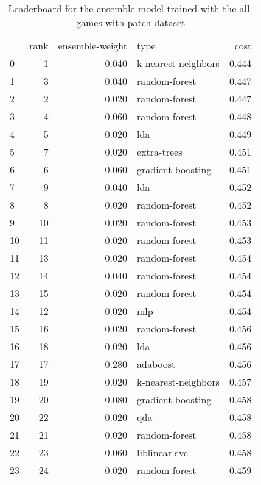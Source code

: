 \begin{table}[]
	\centering
	\begin{tabular}{lrrlr}
		   & rank & ensemble-weight & type                & cost  \\
		0  & 1    & 0.040           & k-nearest-neighbors & 0.444 \\
		1  & 3    & 0.040           & random-forest       & 0.447 \\
		2  & 2    & 0.020           & random-forest       & 0.447 \\
		3  & 4    & 0.060           & random-forest       & 0.448 \\
		4  & 5    & 0.020           & lda                 & 0.449 \\
		5  & 7    & 0.020           & extra-trees         & 0.451 \\
		6  & 6    & 0.060           & gradient-boosting   & 0.451 \\
		7  & 9    & 0.040           & lda                 & 0.452 \\
		8  & 8    & 0.020           & random-forest       & 0.452 \\
		9  & 10   & 0.020           & random-forest       & 0.453 \\
		10 & 11   & 0.020           & random-forest       & 0.453 \\
		11 & 13   & 0.020           & random-forest       & 0.454 \\
		12 & 14   & 0.040           & random-forest       & 0.454 \\
		13 & 15   & 0.020           & random-forest       & 0.454 \\
		14 & 12   & 0.020           & mlp                 & 0.454 \\
		15 & 16   & 0.020           & random-forest       & 0.456 \\
		16 & 18   & 0.020           & lda                 & 0.456 \\
		17 & 17   & 0.280           & adaboost            & 0.456 \\
		18 & 19   & 0.020           & k-nearest-neighbors & 0.457 \\
		19 & 20   & 0.080           & gradient-boosting   & 0.458 \\
		20 & 22   & 0.020           & qda                 & 0.458 \\
		21 & 21   & 0.020           & random-forest       & 0.458 \\
		22 & 23   & 0.060           & liblinear-svc       & 0.458 \\
		23 & 24   & 0.020           & random-forest       & 0.459 \\
	\end{tabular}

	\caption{Leaderboard for the ensemble model trained with the all-games-with-patch dataset}
	\label{tab:lb-all-games-with-patch}
\end{table}

